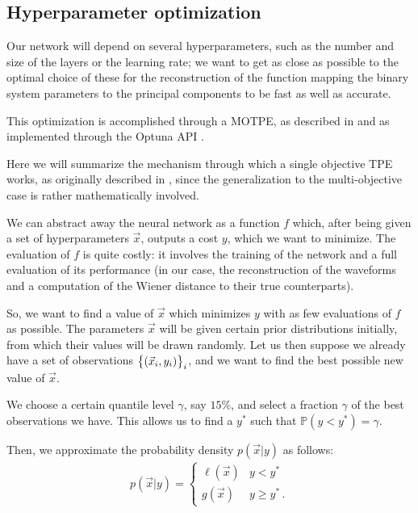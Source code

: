 \documentclass[main.tex]{subfiles}
\begin{document}
\subsection{Hyperparameter optimization}

Our network will depend on several hyperparameters, such as the number and size of the layers or the learning rate; we want to get as close as possible to the optimal choice of these for the reconstruction of the function mapping the binary system parameters to the principal components to be fast as well as accurate.

This optimization is accomplished through a \ac{MOTPE}, as described in \textcite[]{ozakiMultiobjectiveTreestructuredParzen2020} and as implemented through the Optuna API \cite[]{akibaOptunaNextgenerationHyperparameter2019}.

Here we will summarize the mechanism through which a single objective \ac{TPE} works, as originally described in \textcite[section 4]{bergstraAlgorithmsHyperParameterOptimization2011}, since
the generalization to the multi-objective case \cite[]{ozakiMultiobjectiveTreestructuredParzen2020} is rather mathematically involved. 

We can abstract away the neural network as a function \(f\) which, after being given a set of hyperparameters \(\vec{x}\), outputs a cost \(y\), which we want to minimize.
The evaluation of \(f\) is quite costly: it involves the training of the network and a full evaluation of its performance (in our case, the reconstruction of the waveforms and a computation of the Wiener distance to their true counterparts).  

So, we want to find a value of \(\vec{x}\) which minimizes \(y\) with as few evaluations of \(f\) as possible. 
The parameters \(\vec{x}\) will be given certain prior distributions initially, from which their values will be drawn randomly. 
Let us then suppose we already have a set of observations \(\qty{(\vec{x}_i, y_i)}_i\), and we want to find the best possible new value of \(\vec{x}\). 

We choose a certain quantile level \(\gamma\), say \(15 \%\), and select a fraction \(\gamma \) of the best observations we have. This allows us to find a \(y^{*}\) such that \(\mathbb{P}(y < y^{*}) = \gamma \).  

Then, we approximate the probability density \(p(\vec{x} | y)\) as follows: 
%
\begin{align}
p(\vec{x} | y) = 
\begin{cases}
    \ell (\vec{x}) & y < y^{*} \\
    g (\vec{x}) & y \geq y^{*} 
\,.
\end{cases}
\end{align}
%
\end{document}
